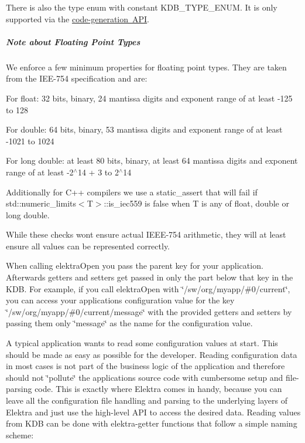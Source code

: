 There is also the type {\ttfamily enum} with constant {\ttfamily K\+D\+B\+\_\+\+T\+Y\+P\+E\+\_\+\+E\+N\+UM}. It is only supported via the \mbox{\hyperlink{doc_help_elektra-highlevel-gen_md}{code-\/generation A\+PI}}.

\label{src_libs_highlevel_README_md_autotoc_md14}%
%
\subparagraph*{Note about Floating Point Types}

We enforce a few minimum properties for floating point types. They are taken from the I\+E\+E-\/754 specification and are\+:


\begin{DoxyItemize}
\item For {\ttfamily float}\+: 32 bits, binary, 24 mantissa digits and exponent range of at least -\/125 to 128
\item For {\ttfamily double}\+: 64 bits, binary, 53 mantissa digits and exponent range of at least -\/1021 to 1024
\item For {\ttfamily long double}\+: at least 80 bits, binary, at least 64 mantissa digits and exponent range of at least -\/2$^\wedge$14 + 3 to 2$^\wedge$14
\end{DoxyItemize}

Additionally for C++ compilers we use a {\ttfamily static\+\_\+assert} that will fail if {\ttfamily std\+::numeric\+\_\+limits$<$T$>$\+::is\+\_\+iec559} is {\ttfamily false} when {\ttfamily T} is any of {\ttfamily float}, {\ttfamily double} or {\ttfamily long double}.

While these checks won\textquotesingle{}t ensure actual I\+E\+E\+E-\/754 arithmetic, they will at least ensure all values can be represented correctly.

\label{_reading-and-writing-values}%


When calling {\ttfamily elektra\+Open} you pass the parent key for your application. Afterwards getters and setters get passed in only the part below that key in the K\+DB. For example, if you call {\ttfamily elektra\+Open} with {\ttfamily \char`\"{}/sw/org/myapp/\#0/current\char`\"{}}, you can access your applications configuration value for the key {\ttfamily \char`\"{}/sw/org/myapp/\#0/current/message\char`\"{}} with the provided getters and setters by passing them only {\ttfamily \char`\"{}message\char`\"{}} as the name for the configuration value.

\label{_read-values-from-the-kdb}%


A typical application wants to read some configuration values at start. This should be made as easy as possible for the developer. Reading configuration data in most cases is not part of the business logic of the application and therefore should not \char`\"{}pollute\char`\"{} the applications source code with cumbersome setup and file-\/parsing code. This is exactly where Elektra comes in handy, because you can leave all the configuration file handling and parsing to the underlying layers of Elektra and just use the high-\/level A\+PI to access the desired data. Reading values from K\+DB can be done with elektra-\/getter functions that follow a simple naming scheme\+:


